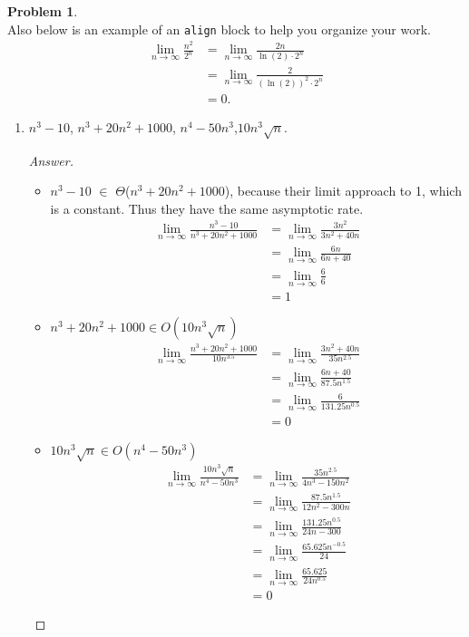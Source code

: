 \documentclass[11pt]{article}
\theoremstyle{definition}
\theoremstyle{definition}
\newtheorem{required}{Problem}
\theoremstyle{definition}
\begin{document}
\begin{required}
\noindent \\ Also below is an example of an \texttt{align} block to help you organize your work.
\begin{align*}
\lim_{n \to \infty} \frac{n^{2}}{2^{n}} &= \lim_{n \to \infty} \frac{2n}{\ln(2) \cdot 2^{n}} \\
&= \lim_{n \to \infty} \frac{2}{(\ln(2))^{2} \cdot 2^{n}} \\
&= 0.
\end{align*}
\newpage
\begin{enumerate} [label=(\alph*)]
\subsection{Problem 2\ref{1a}}
    \item \label{1a} $ n^3-10$, \qquad  $ n^3+20n^2+1000$, \qquad $n^4-50n^3$,\qquad  $10n^3\sqrt{n}$.
    \begin{proof}[Answer]
\begin{itemize}
\item  $ n^3-10$ $\in$ $\Theta$($ n^3+20n^2+1000$), because their limit approach to 1, which is a constant. Thus they have the same asymptotic rate. \\
\begin{align*}
\lim_{n \to \infty} \frac{n^3-10}{n^3+20n^2+1000} &= \lim_{n \to \infty} \frac{3n^2}{3n^2+40n} \\
&= \lim_{n \to \infty} \frac{6n}{6n+40} \\
&= \lim_{n \to \infty} \frac{6}{6} \\
&= 1
\end{align*}

\item $ n^3+20n^2+1000 \in O(10n^3\sqrt{n})$\\
\begin{align*}
\lim_{n \to \infty} \frac{n^3+20n^2+1000}{10n^{3.5}} &= \lim_{n \to \infty} \frac{3n^2+40n}{35n^{2.5}} \\
&= \lim_{n \to \infty} \frac{6n+40}{87.5n^{1.5}} \\
&= \lim_{n \to \infty} \frac{6}{131.25n^{0.5}} \\
&= 0
\end{align*}

\item $10n^3\sqrt{n} \in O(n^4-50n^3)$\\
\begin{align*}
\lim_{n \to \infty} \frac{10n^3\sqrt{n}}{n^4-50n^3} &= \lim_{n \to \infty} \frac{35n^{2.5}}{4n^3-150n^2} \\
&= \lim_{n \to \infty} \frac{87.5n^{1.5}}{12n^2-300n} \\
&= \lim_{n \to \infty} \frac{131.25n^{0.5}}{24n-300} \\
&= \lim_{n \to \infty} \frac{65.625n^{-0.5}}{24} \\
&= \lim_{n \to \infty} \frac{65.625}{{24n^{0.5}}} \\
&= 0
\end{align*}


\end{itemize}
\end{proof}
\end{enumerate}
\end{required}
\end{document}

